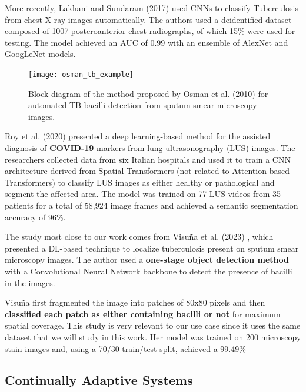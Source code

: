 \documentclass[../main.tex]{subfiles}
\begin{document}
    More recently, Lakhani and Sundaram (2017) \cite{lakhaniDeepLearningChest2017} used CNNs to classify Tuberculosis from chest X-ray images automatically. The authors used a deidentified dataset composed of 1007 posteroanterior chest radiographs, of which 15\% were used for testing. The model achieved an AUC of 0.99 with an ensemble of AlexNet \cite{krizhevskyImageNetClassificationDeep2012} and GoogLeNet \cite{szegedyGoingDeeperConvolutions2014} models.
    
    \begin{figure}[h]
       \centering
       \texttt{[image: osman\_tb\_example]}
       \caption{Block diagram of the method proposed by Osman et al. (2010) \cite{osmanDetectionMycobacteriumTuberculosis2010} for automated TB bacilli detection from sputum-smear microscopy images.}
       \label{fig:visuna_method}
    \end{figure}
    \clearpage

    Roy et al. (2020) \cite{royDeepLearningClassification2020} presented a deep learning-based method for the assisted diagnosis of \textbf{COVID-19} markers from lung ultrasonography (LUS) images. The researchers collected data from six Italian hospitals and used it to train a CNN architecture derived from Spatial Transformers \cite{jaderbergSpatialTransformerNetworks2016} (not related to Attention-based Transformers) to classify LUS images as either healthy or pathological and segment the affected area. The model was trained on 77 LUS videos from 35 patients for a total of 58,924 image frames and achieved a semantic segmentation accuracy of 96\%.
    

     The study most close to our work comes from Visuña et al. (2023) \cite{visuna_novel_2023}, which presented a DL-based technique to localize tuberculosis present on sputum smear microscopy images. The author used a \textbf{one-stage object detection method} with a Convolutional Neural Network backbone to detect the presence of bacilli in the images. 
     
     Visuña first fragmented the image into patches of 80x80 pixels and then \textbf{classified each patch as either containing bacilli or not} for maximum spatial coverage. This study is very relevant to our use case since it uses the same dataset that we will study in this work. Her model was trained on 200 microscopy stain images and, using a 70/30 train/test split, achieved a 99.49\% %

    
    \subsection{Continually Adaptive Systems} \label{sec:continually_adaptive_systems_sota} 
\end{document}
